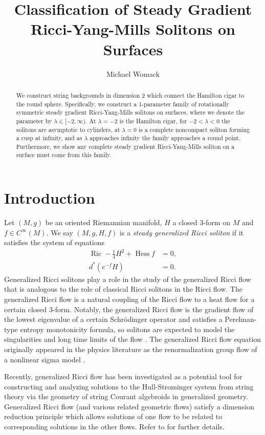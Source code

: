 \documentclass[12pt, a4paper, reqno, oneside]{amsart}
\title{Classification of Steady Gradient Ricci-Yang-Mills Solitons on Surfaces}
\author{Michael Womack}
\DeclareMathOperator{\Hess}{Hess}
\DeclareMathOperator{\Ric}{Ric}
\numberwithin{equation}{section}
\theoremstyle{plain}
\theoremstyle{definition}
\theoremstyle{plain}
\begin{document}
\begin{abstract}
  We construct string backgrounds in dimension 2 which connect the Hamilton cigar to the round sphere. Specifically, we construct a 1-parameter family of rotationally symmetric steady gradient Ricci-Yang-Mills solitons on surfaces, where we denote the parameter by $\lambda\in[-2,\infty)$. At $\lambda=-2$ is the Hamilton cigar, for $-2<\lambda<0$ the solitons are asymptotic to cylinders, at $\lambda=0$ is a complete noncompact soliton forming a cusp at infinity, and as $\lambda$ approaches infinity the family approaches a round point. Furthermore, we show any complete steady gradient Ricci-Yang-Mills soliton on a surface must come from this family.
\end{abstract}

\maketitle

\section{Introduction}
Let $(M,g)$ be an oriented Riemannian manifold, $H$ a closed 3-form on $M$ and $f\in C^{\infty}(M)$. We say $(M,g,H,f)$ is a \emph{steady generalized Ricci soliton} if it satisfies the system of equations
\begin{equation*}
  \begin{split}
    \Ric-\tfrac{1}{4}H^{2}+\Hess{f} &= 0,\\
    d^*(e^{-f}H) &= 0.
  \end{split}
\end{equation*}
Generalized Ricci solitons play a role in the study of the generalized Ricci flow that is analogous to the role of classical Ricci solitons in the Ricci flow. The generalized Ricci flow is a natural coupling of the Ricci flow to a heat flow for a certain closed 3-form. Notably, the generalized Ricci flow is the gradient flow of the lowest eigenvalue of a certain Schr\"odinger operator and satisfies a Perelman-type entropy monotonicity formula, so solitons are expected to model the singularities and long time limits of the flow \cite{mgf_streetsGRF2021}. The generalized Ricci flow equation originally appeared in the physics literature as the renormalization group flow of a nonlinear sigma model \cite{polchinski_StringTheoryVol11998}. 

Recently, generalized Ricci flow has been investigated as a potential tool for constructing and analyzing solutions to the Hull-Strominger system from string theory via the geometry of string Courant algebroids in generalized geometry. Generalized Ricci flow (and various related geometric flows) satisfy a dimension reduction principle which allows solutions of one flow to be related to corresponding solutions in the other flows. Refer to \cite{garciafernandezMolinaStreetsPluriclosedFlowHullStrominger2026} for further details. 
\end{document}
